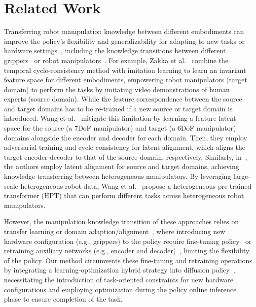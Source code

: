 \section{Related Work} 

Transferring robot manipulation knowledge between different embodiments can improve the policy's flexibility and generalizability for adapting to new tasks or hardware settings~\cite{wang2024scaling}, including the knowledge transitions between different grippers~\cite{zakka2022xirl} or robot manipulators~\cite{wang2024scaling,wang2024cross,tatiya2023transferring}. For example, Zakka et al.~\cite{zakka2022xirl} combine the temporal cycle-consistency method with imitation learning to learn an invariant feature space for different embodiments, empowering robot manipulators (target domain) to perform the tasks by imitating video demonstrations of human experts (source domain). While the feature correspondence between the source and target domains has to be re-trained if a new source or target domain is introduced. Wang et al.~\cite{wang2024cross} mitigate this limitation by learning a feature latent space for the source (a 7DoF manipulator) and target (a 6DoF manipulator) domains alongside the encoder and decoder for each domain. Then, they employ adversarial training and cycle consistency for latent alignment, which aligns the target encoder-decoder to that of the source domain, respectively. Similarly, in~\cite{tatiya2023transferring}, the authors employ latent alignment for source and target domains, achieving knowledge transferring between heterogeneous manipulators. By leveraging large-scale heterogeneous robot data, Wang et al.~\cite{wang2024scaling} propose a heterogeneous pre-trained transformer (HPT) that can perform different tasks across heterogeneous robot manipulators. 

However, the manipulation knowledge transition of these approaches relies on transfer learning or domain adaption/alignment~\cite{wang2024cross,wang2024scaling,tatiya2023transferring}, where introducing new hardware configuration (e.g., grippers) to the policy require fine-tuning policy~\cite{wang2024scaling} or retraining auxiliary networks (e.g., encoder and decoder)~\cite{wang2024cross,tatiya2023transferring}, limiting the flexibility of the policy. Our method circumvents these fine-tuning and retraining operations by integrating a learning-optimization hybrid strategy into diffusion policy~\cite{chi2023diffusion}, necessitating the introduction of task-oriented constraints for new hardware configurations and employing optimization during the policy online inference phase to ensure completion of the task.

